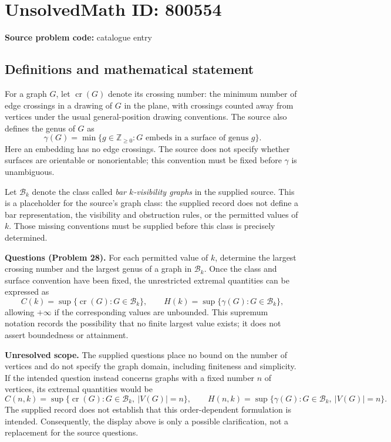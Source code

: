 \documentclass[11pt]{article}
\newcommand{\Z}{\mathbb{Z}}
\begin{document}
\section*{UnsolvedMath ID: 800554}
\textbf{Source problem code:} catalogue entry
\subsection{Definitions and mathematical statement}
For a graph \(G\), let \(\operatorname{cr}(G)\) denote its crossing number: the minimum number of edge crossings in a drawing of \(G\) in the plane, with crossings counted away from vertices under the usual general-position drawing conventions. The source also defines the genus of \(G\) as
\[
\gamma(G)=\min\{g\in\Z_{\ge 0}:G\text{ embeds in a surface of genus }g\}.
\]
Here an embedding has no edge crossings. The source does not specify whether surfaces are orientable or nonorientable; this convention must be fixed before \(\gamma\) is unambiguous.

Let \(\mathcal B_k\) denote the class called \emph{bar \(k\)-visibility graphs} in the supplied source. This is a placeholder for the source's graph class: the supplied record does not define a bar representation, the visibility and obstruction rules, or the permitted values of \(k\). Those missing conventions must be supplied before this class is precisely determined.

\textbf{Questions (Problem 28).} For each permitted value of \(k\), determine the largest crossing number and the largest genus of a graph in \(\mathcal B_k\). Once the class and surface convention have been fixed, the unrestricted extremal quantities can be expressed as
\[
C(k)=\sup\{\operatorname{cr}(G):G\in\mathcal B_k\},
\qquad
H(k)=\sup\{\gamma(G):G\in\mathcal B_k\},
\]
allowing \(+\infty\) if the corresponding values are unbounded. This supremum notation records the possibility that no finite largest value exists; it does not assert boundedness or attainment.

\textbf{Unresolved scope.} The supplied questions place no bound on the number of vertices and do not specify the graph domain, including finiteness and simplicity. If the intended question instead concerns graphs with a fixed number \(n\) of vertices, its extremal quantities would be
\[
C(n,k)=\sup\{\operatorname{cr}(G):G\in\mathcal B_k,\ |V(G)|=n\},
\qquad
H(n,k)=\sup\{\gamma(G):G\in\mathcal B_k,\ |V(G)|=n\}.
\]
The supplied record does not establish that this order-dependent formulation is intended. Consequently, the display above is only a possible clarification, not a replacement for the source questions.
\end{document}
